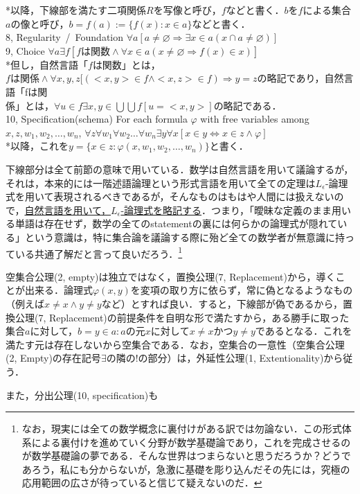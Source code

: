 \documentclass[uplatex, 12pt, a4paper, dvipdfmx]{jsarticle}
\begin{document}
\begin{shadebox}
\begin{definition}
	\hspace{5mm}*以降，下線部を満たす二項関係$R$を写像と呼び，$f$などと書く．$b$を$f$による集合$a$の像と呼び，$b=f(a):=\{ f(x) : x\in a \}$などと書く．\\
	8, \rm{Regularity\, /\, Foundation}   $\forall a [a\neq \varnothing \Longrightarrow \exists x\in a (x\cap a \neq \varnothing )] $\\
	9, \rm{Choice}   $\forall a \exists f [fは関数 \wedge \forall x\in a (x\neq \varnothing \Longrightarrow f(x)\in x)]$\\
	\hspace{5mm}*但し，自然言語「$f$は関数」とは，$fは関係 \wedge \forall x,y,z[(<x,y>\in f \wedge <x,z>\in f ) \Longrightarrow y=z$の略記であり，自然言語「fは関\\ \hspace{5mm}係」とは，$\forall u \in f \exists x,y \in \bigcup \bigcup f[u=<x,y>]$の略記である．\\
	10, \rm{Specification(schema)} \; \rm{For each formula $\varphi$ with free variables among} $x,z,w_1,w_2,\dots,w_n$, $\forall z \forall w_1 \forall w_2 \dots \forall w_n \exists y \forall x [x\in y \Longleftrightarrow x\in z \wedge \varphi]$ \\
	\hspace{5mm}*以降，これを$y=\{ x\in z: \varphi (x,w_1,w_2,\dots ,w_n)\}$と書く．
\end{definition}	
\end{shadebox}

下線部分は全て前節の意味で用いている．数学は自然言語を用いて議論するが，それは，本来的には一階述語論理という形式言語を用いて全ての定理は$L_\epsilon$-論理式を用いて表現されるべきであるが，そんなものはもはや人間には扱えないので，\underline{自然言語を用いて，$L_\epsilon$-論理式を略記する}．つまり，「曖昧な定義のまま用いる単語は存在せず，数学の全てのstatementの裏には何らかの論理式が隠れている」という意識は，特に集合論を議論する際に殆ど全ての数学者が無意識に持っている共通了解だと言って良いだろう．\footnote{なお，現実には全ての数学概念に裏付けがある訳では勿論ない．この形式体系による裏付けを進めていく分野が数学基礎論であり，これを完成させるのが数学基礎論の夢である．そんな世界はつまらないと思うだろうか？どうであろう，私にも分からないが，急激に基礎を彫り込んだその先には，究極の応用範囲の広さが待っていると信じて疑えないのだ．}

空集合公理(2, empty)は独立ではなく，置換公理(7, Replacement)から，導くことが出来る．論理式$\varphi (x,y)$を変項の取り方に依らず，常に偽となるようなもの（例えば$x\neq x \wedge y\neq y$など）とすれば良い．すると，下線部が偽であるから，置換公理(7, Replacement)の前提条件を自明な形で満たすから，ある勝手に取った集合$a$に対して，$b={y\in a : aの元xに対して x\neq x かつ y\neq yである}$となる．これを満たす元は存在しないから空集合である．なお，空集合の一意性（空集合公理(2, Empty)の存在記号$\exists$の隣の!の部分）は，外延性公理(1, Extentionality)から従う．\par
また，分出公理(10, specification)も
\end{document}
